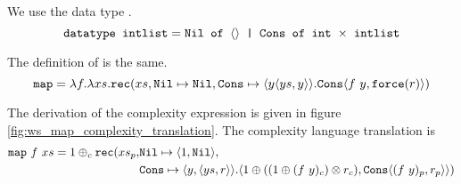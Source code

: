 We use the data type .
\begin{equation*}
  \texttt{datatype intlist} = \texttt{Nil of }\langle\rangle \texttt{ | Cons of int $\times$ intlist}
\end{equation*}

The definition of  is the same.
\begin{equation*}
  \texttt{map} = \lambda f. \lambda xs . \texttt{rec}(xs, \texttt{Nil} \mapsto \texttt{Nil}, \texttt{Cons} \mapsto \langle y \langle ys, y \rangle\rangle. \texttt{Cons}\langle f\ y, \texttt{force}(r)\rangle)
\end{equation*}

The derivation of the complexity expression is given in figure \ref{fig:ws_map_complexity_translation}.
The complexity language translation is
\begin{equation*}
\begin{split}
  \T{map}\ f\ xs = 1 \oplus_c \T{rec}(xs_p,& \T{Nil}\mapsto \langle 1, \T{Nil}\rangle,\\
  &\T{Cons} \mapsto \langle y, \langle ys, r \rangle \rangle. \langle 1 \oplus ((1 \oplus (f\ y)_c) \otimes r_c), \T{Cons} \langle (f\ y)_p, r_p \rangle \rangle)
\end{split}
\end{equation*}

